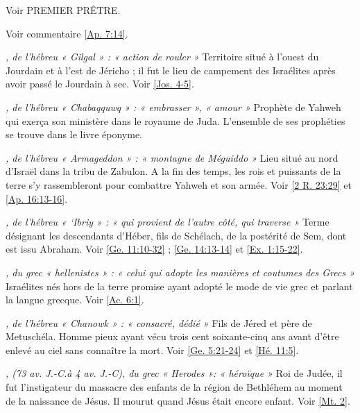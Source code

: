\begin{multicols}{2}
\textit{}\newline
Voir PREMIER PRÊTRE.

\textit{}\newline
Voir commentaire \vref{Ap. 7:14}.

\textit{, de l'hébreu « Gilgal » : « action de rouler »}\newline
Territoire situé à l'ouest du Jourdain et à l'est de Jéricho ; il fut le lieu de campement des Israélites après avoir passé le Jourdain à sec. Voir \vref{Jos. 4-5}.

\textit{, de l'hébreu « Chabaqquwq » : « embrasser », « amour »}\newline
Prophète de Yahweh qui exerça son ministère dans le royaume de Juda. L'ensemble de ses prophéties se trouve dans le livre éponyme.

\textit{, de l'hébreu « Armageddon » : « montagne de Méguiddo »}\newline
Lieu situé au nord d'Israël dans la tribu de Zabulon. A la fin des temps, les rois et puissants de la terre s'y rassembleront pour combattre Yahweh et son armée. Voir \vref{2 R. 23:29} et \vref{Ap. 16:13-16}.

\textit{, de l'hébreu « `Ibriy » : « qui provient de l'autre côté, qui traverse »}\newline
Terme désignant les descendants d'Héber, fils de Schélach, de la postérité de Sem, dont est issu Abraham. Voir \vref{Ge. 11:10-32} ; \vref{Ge. 14:13-14} et \vref{Ex. 1:15-22}.

\textit{, du grec « hellenistes » : « celui qui adopte les manières et coutumes des Grecs »}\newline
Israélites nés hors de la terre promise ayant adopté le mode de vie grec et parlant la langue grecque. Voir \vref{Ac. 6:1}.

\textit{, de l'hébreu « Chanowk » : « consacré, dédié »}\newline
Fils de Jéred et père de Metuschéla. Homme pieux ayant vécu trois cent soixante-cinq ans avant d'être enlevé au ciel sans connaître la mort. Voir \vref{Ge. 5:21-24} et \vref{Hé. 11:5}.

\textit{, (73 av. J.-C.à 4 av. J.-C), du grec « Herodes »: « héroïque »}\newline
Roi de Judée, il fut l'instigateur du massacre des enfants de la région de Bethléhem au moment de la naissance de Jésus. Il mourut quand Jésus était encore enfant. Voir \vref{Mt. 2}.


\end{multicols}
